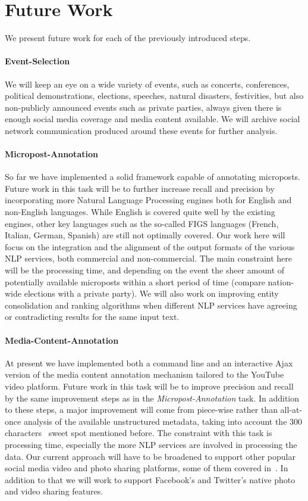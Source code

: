 \documentclass[runningheads,a4paper]{llncs}
\begin{document}
\section{Future Work}
We present future work for each of the previously introduced steps.

\paragraph{\bf{Event-Selection}}
We will keep an eye on a wide variety of events, such as concerts, conferences, political demonstrations, elections, speeches, natural disasters, festivities, but also non-publicly announced events such as private parties, always given there is enough social media coverage and media content available. We will archive social network communication produced around these events for further analysis.

\paragraph{\bf{Micropost-Annotation}}
So far we have implemented a solid framework capable of annotating microposts. Future work in this task will be to further increase recall and precision by incorporating more Natural Language Processing engines both for English and non-English languages. While English is covered quite well by the existing engines, other key languages such as the so-called FIGS languages (French, Italian, German, Spanish) are still not optimally covered. Our work here will focus on the integration and the alignment of the output formats of the various NLP services, both commercial and non-commercial. The main constraint here will be the processing time, and depending on the event the sheer amount of potentially available microposts within a short period of time (compare nation-wide elections with a private party). We will also work on improving entity consolidation and ranking algorithms when different NLP services have agreeing or contradicting results for the same input text.

\paragraph{\bf{Media-Content-Annotation}}
At present we have implemented both a command line and an interactive Ajax version of the media content annotation mechanism tailored to the YouTube video platform. Future work in this task will be to improve precision and recall by the same improvement steps as in the \emph{Micropost-Annotation} task. In addition to these steps, a major improvement will come from piece-wise rather than all-at-once analysis of the available unstructured metadata, taking into account the 300 characters~\cite{andraz} sweet spot mentioned before. The constraint with this task is processing time, especially the more NLP services are involved in processing the data. Our current approach will have to be broadened to support other popular social media video and photo sharing platforms, some of them covered in~\cite{techcrunch}. In addition to that we will work to support Facebook's and Twitter's native photo and video sharing features.
\end{document}
